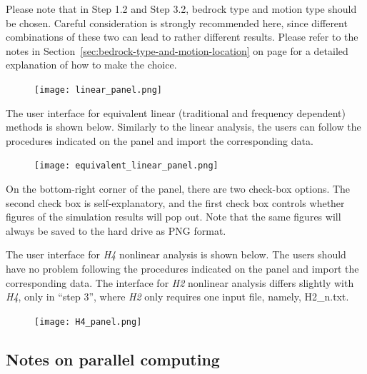 \documentclass[11pt,letterpaper]{article}
\begin{document}
Please note that in Step 1.2 and Step 3.2, bedrock type and motion type should be chosen. Careful consideration is strongly recommended here, since different combinations of these two can lead to rather different results.  Please refer to the notes in Section~\ref{sec:bedrock-type-and-motion-location} on page \pageref{sec:bedrock-type-and-motion-location} for a detailed explanation of how to make the choice.

\begin{figure}[H]
\centering
  \texttt{[image: linear\_panel.png]}\\
\end{figure}


\newpage
The user interface for equivalent linear (traditional and frequency dependent) methods is shown below. Similarly to the linear analysis, the users can follow the procedures indicated on the panel and import the corresponding data.

\begin{figure}[H]
\centering
  \texttt{[image: equivalent\_linear\_panel.png]}\\
\end{figure}

On the bottom-right corner of the panel, there are two check-box options. The second check box is self-explanatory, and the first check box controls whether figures of the simulation results will pop out. Note that the same figures will always be saved to the hard drive as PNG format.

\newpage
The user interface for \emph{H4} nonlinear analysis is shown below. The users should have no problem following the procedures indicated on the panel and import the corresponding data. The interface for \emph{H2} nonlinear analysis differs slightly with \emph{H4}, only in ``step 3'', where \emph{H2} only requires one input file, namely, \textsf{H2\_n.txt}.

\begin{figure}[H]
\centering
  \texttt{[image: H4\_panel.png]}\\
\end{figure}

\subsection{Notes on parallel computing}
\end{document}
